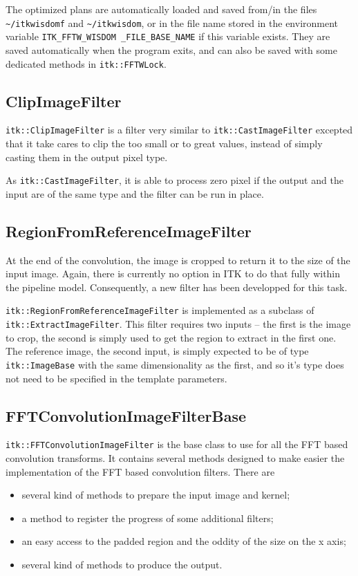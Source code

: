\documentclass{InsightArticle}
\begin{document}
The optimized plans are automatically loaded and saved from/in the files \verb$~/itkwisdomf$ and \verb$~/itkwisdom$,
or in the file name stored in the environment variable \verb$ITK_FFTW_WISDOM _FILE_BASE_NAME$ if this
variable exists.
They are saved automatically when the program exits, and can also be saved with some dedicated methods
in \verb$itk::FFTWLock$.

\subsection{ClipImageFilter}

\verb$itk::ClipImageFilter$ is a filter very similar to \verb$itk::CastImageFilter$ excepted that it
take cares to clip the too small or to great values, instead of simply casting them in the output
pixel type.

As \verb$itk::CastImageFilter$, it is able to process zero pixel if the output and the input are of the
same type and the filter can be run in place.

\subsection{RegionFromReferenceImageFilter}

At the end of the convolution, the image is cropped to return it to the size of the input image. Again,
there is currently no option in ITK to do that fully within the pipeline model. Consequently, a new
filter has been developped for this task.

\verb$itk::RegionFromReferenceImageFilter$ is implemented as a subclass of \verb$itk::ExtractImageFilter$.
This filter requires two inputs -- the first is the image to crop, the second is simply used to get 
the region to extract in the first one. The reference image, the second input, is simply expected to
be of type \verb$itk::ImageBase$ with the same dimensionality as the first, and so it's type does not
need to be specified in the template parameters.

\subsection{FFTConvolutionImageFilterBase}

\verb$itk::FFTConvolutionImageFilter$ is the base class to use for all the FFT based convolution transforms. It
contains several methods designed to make easier the implementation of the FFT based convolution filters. There
are 
\begin{itemize}
 \item several kind of methods to prepare the input image and kernel;
 \item a method to register the progress of some additional filters;
 \item an easy access to the padded region and the oddity of the size on the x axis;
 \item several kind of methods to produce the output.
\end{itemize}
\end{document}
